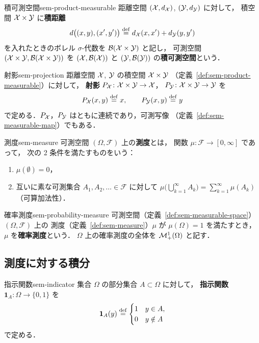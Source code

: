 \begin{definition}{積可測空間}{sem-product-measurable}
  距離空間 $(\mathcal{X}, d_{\mathcal{X}})$, $(\mathcal{Y}, d_{\mathcal{Y}})$ に対して，
  積空間 $\mathcal{X} \times \mathcal{Y}$ に\textbf{積距離}
  \[
    d\bigl((x, y), (x', y')\bigr) \overset{\mathrm{def}}{=} d_{\mathcal{X}}(x, x') + d_{\mathcal{Y}}(y, y')
  \]
  を入れたときのボレル $\sigma$-代数を $\mathcal{B}(\mathcal{X} \times \mathcal{Y})$ と記し，
  可測空間 $(\mathcal{X} \times \mathcal{Y}, \mathcal{B}(\mathcal{X} \times \mathcal{Y}))$ を
  $(\mathcal{X}, \mathcal{B}(\mathcal{X}))$ と $(\mathcal{Y}, \mathcal{B}(\mathcal{Y}))$ の\textbf{積可測空間}という．
\end{definition}

\begin{definition}{射影}{sem-projection}
  距離空間 $\mathcal{X}$, $\mathcal{Y}$ の積空間 $\mathcal{X} \times \mathcal{Y}$
  （定義~\ref{def:sem-product-measurable}）に対して，
  \textbf{射影} $P_{\mathcal{X}} \colon \mathcal{X} \times \mathcal{Y} \to \mathcal{X}$，
  $P_{\mathcal{Y}} \colon \mathcal{X} \times \mathcal{Y} \to \mathcal{Y}$ を
  \[
    P_{\mathcal{X}}(x, y) \overset{\mathrm{def}}{=} x,
    \qquad
    P_{\mathcal{Y}}(x, y) \overset{\mathrm{def}}{=} y
  \]
  で定める．$P_{\mathcal{X}}$，$P_{\mathcal{Y}}$ はともに連続であり，可測写像
  （定義~\ref{def:sem-measurable-map}）でもある．
\end{definition}

\begin{definition}{測度}{sem-measure}
  可測空間 $(\Omega, \mathcal{F})$ 上の\textbf{測度}とは，
  関数 $\mu \colon \mathcal{F} \to [0, \infty]$ であって，
  次の 2 条件を満たすものをいう：
  \begin{enumerate}
    \item[(i)] $\mu(\emptyset) = 0$，
    \item[(ii)] 互いに素な可測集合 $A_1, A_2, \ldots \in \mathcal{F}$ に対して
      $\mu\bigl(\bigcup_{k=1}^{\infty} A_k\bigr) = \sum_{k=1}^{\infty} \mu(A_k)$
      （可算加法性）．
  \end{enumerate}
\end{definition}

\begin{definition}{確率測度}{sem-probability-measure}
  可測空間（定義~\ref{def:sem-measurable-space}）$(\Omega, \mathcal{F})$ 上の
  測度（定義~\ref{def:sem-measure}）$\mu$ が $\mu(\Omega) = 1$ を満たすとき，
  $\mu$ を\textbf{確率測度}という．
  $\Omega$ 上の確率測度の全体を $\mathcal{M}_+^1(\Omega)$ と記す．
\end{definition}

\subsection{測度に対する積分}
\label{sec:sem-integration}

\begin{definition}{指示関数}{sem-indicator}
  集合 $\Omega$ の部分集合 $A \subset \Omega$ に対して，
  \textbf{指示関数} $\mathbf{1}_A \colon \Omega \to \{0, 1\}$ を
  \[
    \mathbf{1}_A(y) \overset{\mathrm{def}}{=}
    \begin{cases}
      1 & y \in A, \\
      0 & y \notin A
    \end{cases}
  \]
  で定める．
\end{definition}

